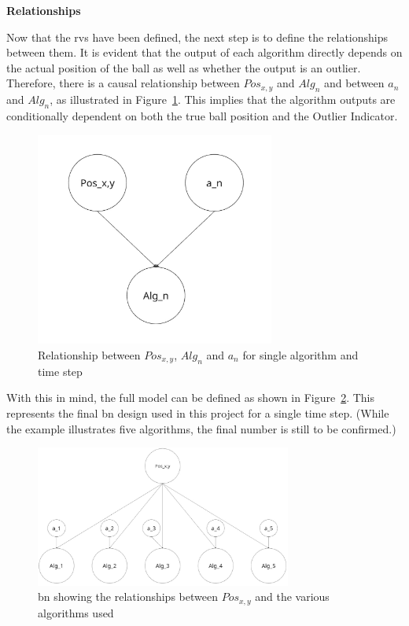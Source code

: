 \documentclass[12pt,a4paper]{article}
\begin{document}
\textbf{Relationships}

Now that the \acs{rv}s have been defined, the next step is to define the relationships between them. It is evident that the output of each algorithm directly depends on the actual position of the ball as well as whether the output is an outlier. Therefore, there is a causal relationship between $Pos_{x,y}$ and $Alg_n$ and between $a_n$ and $Alg_n$, as illustrated in Figure~\ref{fig:smallBN}. This implies that the algorithm outputs are conditionally dependent on both the true ball position and the Outlier Indicator.

\begin{figure}[H]
	\centering
	\includegraphics[width=0.7\textwidth]{smallBN.jpg}
	\caption{Relationship between $Pos_{x,y}$, $Alg_n$ and $a_n$ for single algorithm and time step}
	\label{fig:smallBN}
\end{figure}

With this in mind, the full model can be defined as shown in Figure~\ref{fig:fullBN}. This represents the final \acs{bn} design used in this project for a single time step. (While the example illustrates five algorithms, the final number is still to be confirmed.)

\begin{figure}[H]
	\centering
	\includegraphics[width=0.75\textwidth]{fullBN.jpg}
	\caption{\acl{bn} showing the relationships between $Pos_{x,y}$ and the various algorithms used}
	\label{fig:fullBN}
\end{figure}
\end{document}
